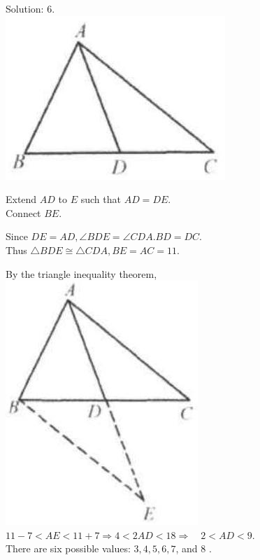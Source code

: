 \documentclass[10pt]{article}
\begin{document}
Solution: 6.\\
\includegraphics[max width=\textwidth, center]{2025_04_17_97bc1f7e44d93c271a88g-024(3)}


Extend \(A D\) to \(E\) such that \(A D=D E\).\\
Connect \(B E\).

Since \(D E=A D, \angle B D E=\angle C D A . B D=D C\).\\
Thus \(\triangle B D E \cong \triangle C D A, B E=A C=11\).

By the triangle inequality theorem,\\
\includegraphics[max width=\textwidth, center]{2025_04_17_97bc1f7e44d93c271a88g-025(1)}\\
\(11-7<A E<11+7 \Rightarrow 4<2 A D<18 \Rightarrow \quad 2<A D<9\).\\
There are six possible values: \(3,4,5,6,7\), and 8 .
\end{document}
